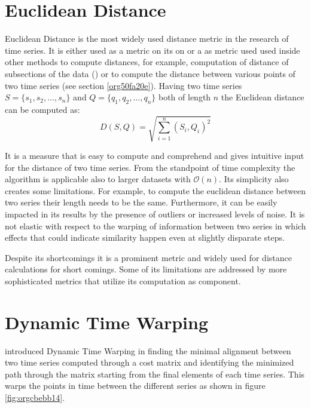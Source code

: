 \documentclass[phd,black, hidelinks]{PrincetonThesis}
\begin{document}
\section{Euclidean Distance}
\label{sec:org6b71cad}
\label{org1b35bfe}
Euclidean Distance is the most widely used distance metric in the research of time series. It is either used as a metric on its on or a as metric used used inside other methods to compute distances, for example, computation of distance of subsections of the data (\cite{Faloutsos_1994}) or to compute the distance between various points of two time series (see section \ref{org50fa20e}). Having two time  series \(S = \{s_1, s_2, \dots, s_n\}\) and \(Q = \{q_1, q_2, \dots, q_n \}\) both of length \(n\) the Euclidean distance can be computed as:
\begin{equation}
D(S,Q) = \sqrt{\sum_{i=1}^{n}{(S_i,Q_i)^2}}
\end{equation}

It is a measure that is easy to compute and comprehend and gives intuitive input for the distance of two time series. From the standpoint of time complexity the algorithm is applicable also to larger datasets with \(\mathcal{O}(n)\). Its simplicity also creates some limitations. For example, to compute the euclidean distance between two series their length needs to be the same. Furthermore, it can be easily impacted in its results by the presence of outliers or increased levels of noise. It is not elastic with respect to the warping of information between two series in which effects that could indicate similarity happen even at slightly disparate steps. 

Despite its shortcomings it is a prominent metric and widely used for distance calculations for short comings. Some of its limitations are addressed by more sophisticated metrics that utilize its computation as component.

\section{Dynamic Time Warping}
\label{sec:org6e72811}
\label{org50fa20e}
\citeauthor{Berndt94usingdynamic} introduced Dynamic Time Warping in \citeyear{Berndt94usingdynamic} finding the minimal alignment between two time series computed through a cost matrix and identifying the minimized path through the matrix starting from the final elements of each time series. This warps the points in time between the different series as shown in figure \ref{fig:orgcbebb14}.
\end{document}
